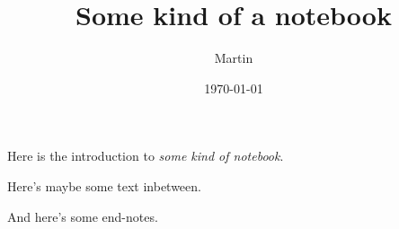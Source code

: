 \documentclass{article}
\title{Some kind of a notebook}
\author{Martin}
\date{\today}
\begin{document}
\maketitle
Here is the introduction to \emph{some kind of notebook}.

Here's maybe some text inbetween.

%
And here's some end-notes.
\end{document}
